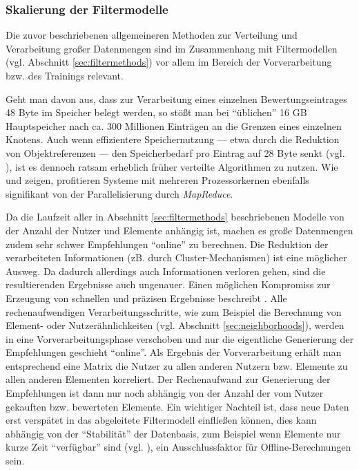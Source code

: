 \subsubsection{Skalierung der Filtermodelle}\label{sec:scalefiltering}

Die zuvor beschriebenen allgemeineren Methoden zur Verteilung und Verarbeitung großer Datenmengen sind im Zusammenhang mit Filtermodellen (vgl. Abschnitt \ref{sec:filtermethods}) vor allem im Bereich der Vorverarbeitung bzw. des Trainings relevant. 

Geht man davon aus, dass zur Verarbeitung eines einzelnen Bewertungseintrages 48 Byte im Speicher belegt werden, so stößt man bei ``üblichen'' 16 GB Hauptspeicher nach ca. 300 Millionen Einträgen an die Grenzen eines einzelnen Knotens. Auch wenn effizientere Speichernutzung --- etwa durch die Reduktion von Objektreferenzen --- den Speicherbedarf pro Eintrag auf 28 Byte senkt (vgl. \citep{mia}), ist es dennoch ratsam erheblich früher verteilte Algorithmen zu nutzen. Wie \citep{mapred06} und \cite{jiang11} zeigen, profitieren Systeme mit mehreren Prozessorkernen ebenfalls signifikant von der Parallelisierung durch \textit{MapReduce}.

Da die Laufzeit aller in Abschnitt \ref{sec:filtermethods} beschriebenen Modelle von der Anzahl der Nutzer und Elemente anhängig ist, machen es große Datenmengen zudem sehr schwer Empfehlungen ``online'' zu berechnen. Die Reduktion der verarbeiteten Informationen (zB. durch Cluster-Mechanismen) ist eine möglicher Ausweg. Da dadurch allerdings auch Informationen verloren gehen, sind die resultierenden Ergebnisse auch ungenauer. Einen möglichen Kompromiss zur Erzeugung von schnellen und präzisen Ergebnisse beschreibt \citep{linden03}. Alle rechenaufwendigen Verarbeitungsschritte, wie zum Beispiel die Berechnung von Element- oder Nutzerähnlichkeiten (vgl. Abschnitt \ref{sec:neighborhoods}), werden in eine Vorverarbeitungsphase verschoben und nur die eigentliche Generierung der Empfehlungen geschieht ``online''. Als Ergebnis der Vorverarbeitung erhält man entsprechend eine Matrix die Nutzer zu allen anderen Nutzern bzw. Elemente zu allen anderen Elementen korreliert. Der Rechenaufwand zur Generierung der Empfehlungen ist dann nur noch abhängig von der Anzahl der vom Nutzer gekauften bzw. bewerteten Elemente. Ein wichtiger Nachteil ist, dass neue Daten erst verspätet in das abgeleitete Filtermodell einfließen können, dies kann abhängig von der ``Stabilität'' der Datenbasis, zum Beispiel wenn Elemente nur kurze Zeit ``verfügbar'' sind (vgl. \citep{Cornelis20074906}), ein Ausschlussfaktor für Offline-Berechnungen sein. \citep{linden03}


